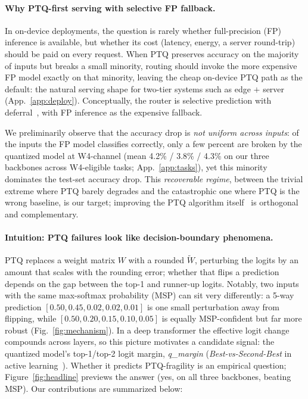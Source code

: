 \documentclass{article}
\newcommand{\fp}{\textsc{FP}\xspace}
\newcommand{\ptq}{\textsc{PTQ}\xspace}
\begin{document}
\paragraph{Why \ptq{}-first serving with selective \fp{} fallback.}
In on-device deployments, the question is rarely whether full-precision (\fp) inference is available, but whether its cost (latency, energy, a server round-trip) should be paid on every request. When \ptq{} preserves accuracy on the majority of inputs but breaks a small minority, routing should invoke the more expensive FP model exactly on that minority, leaving the cheap on-device \ptq{} path as the default: the natural serving shape for two-tier systems such as edge $+$ server (App.~\ref{app:deploy}). Conceptually, the router is selective prediction with deferral~\cite{geifman2017selective}, with \fp{} inference as the expensive fallback.

We preliminarily observe that the accuracy drop is \emph{not uniform across inputs}: of the inputs the \fp{} model classifies correctly, only a few percent are broken by the quantized model at W4-channel (mean 4.2\% / 3.8\% / 4.3\% on our three backbones across W4-eligible tasks; App.~\ref{app:tasks}), yet this minority dominates the test-set accuracy drop. This \emph{recoverable regime}, between the trivial extreme where \ptq{} barely degrades and the catastrophic one where \ptq{} is the wrong baseline, is our target; improving the \ptq{} algorithm itself~\cite{frantar2023gptq,lin2024awq,xiao2023smoothquant,ashkboos2024quarot,li2023repqvit} is orthogonal and complementary.

\paragraph{Intuition: \ptq{} failures look like decision-boundary phenomena.}
\ptq{} replaces a weight matrix $W$ with a rounded $\widetilde{W}$, perturbing the logits by an amount that scales with the rounding error; whether that flips a prediction depends on the gap between the top-1 and runner-up logits. Notably, two inputs with the same max-softmax probability (MSP) can sit very differently: a 5-way prediction $[0.50, 0.45, 0.02, 0.02, 0.01]$ is one small perturbation away from flipping, while $[0.50, 0.20, 0.15, 0.10, 0.05]$ is equally MSP-confident but far more robust (Fig.~\ref{fig:mechanism}). In a deep transformer the effective logit change compounds across layers, so this picture motivates a candidate signal: the quantized model's top-1/top-2 logit margin, \emph{q\_margin} (\emph{Best-vs-Second-Best} in active learning~\cite{joshi2009multi}). Whether it predicts PTQ-fragility is an empirical question; Figure~\ref{fig:headline} previews the answer (yes, on all three backbones, beating MSP). Our contributions are summarized below:
\end{document}
